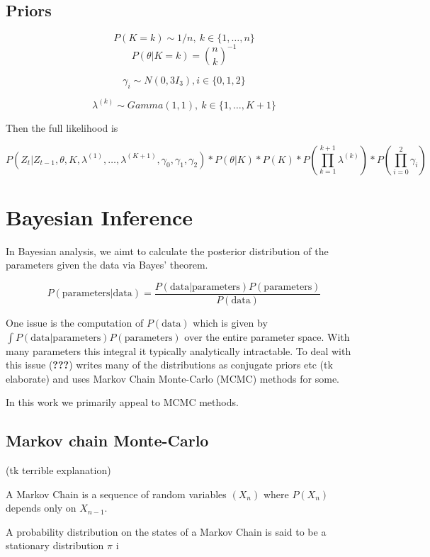 \documentclass[]{article}
\numberwithin{equation}{section}
\begin{document}
\hypertarget{priors}{%
\subsection{Priors}\label{priors}}

\[P(K = k) \sim 1/n,\ k \in \{1,\dots,n\}\]
\[P(\theta|K=k) = \binom{n}{k}^{-1}\]

\[\gamma_i \sim N(0, 3I_3), i \in \{0,1,2\}\]

\[ \lambda^{(k)} \sim Gamma(1, 1),\ k \in \{1, \dots, K + 1\} \]

Then the full likelihood is

\[ P(Z_t|Z_{t-1},\theta, K, \lambda^{(1)}, \dots, \lambda^{(K+1)}, \gamma_0, \gamma_1, \gamma_2)*P(\theta|K)*P(K)*P(\prod_{k=1}^{k+1}\lambda^{(k)} )*P(\prod_{i=0}^2 \gamma_i)  \]

\hypertarget{bayesian-inference}{%
\section{Bayesian Inference}\label{bayesian-inference}}

In Bayesian analysis, we aimt to calculate the posterior distribution of
the parameters given the data via Bayes' theorem.

\[ P(\text{parameters}|\text{data}) = \frac{P(\text{data}|\text{parameters})P(\text{parameters})}{P(\text{data})} \]

One issue is the computation of \(P(\text{data})\) which is given by
\(\int P(\text{data}|\text{parameters})P(\text{parameters})\) over the
entire parameter space. With many parameters this integral it typically
analytically intractable. To deal with this issue ({\textbf{???}})
writes many of the distributions as conjugate priors etc (tk elaborate)
and uses Markov Chain Monte-Carlo (MCMC) methods for some.

In this work we primarily appeal to MCMC methods.

\hypertarget{markov-chain-monte-carlo}{%
\subsection{Markov chain Monte-Carlo}\label{markov-chain-monte-carlo}}

(tk terrible explanation)

A Markov Chain is a sequence of random variables \((X_n)\) where
\(P(X_n)\) depends only on \(X_{n-1}\).

A probability distribution on the states of a Markov Chain is said to be
a stationary distribution \(\pi\) i
\end{document}
